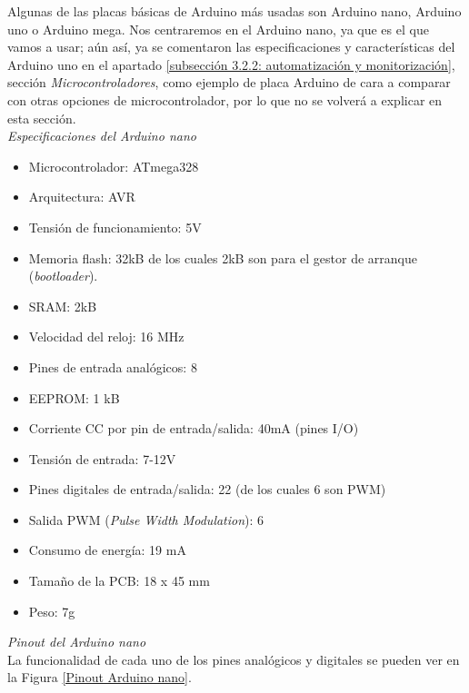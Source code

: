 \documentclass[12pt]{article}
\begin{document}
	\noindent Algunas de las placas básicas de Arduino más usadas son Arduino nano, Arduino uno o Arduino mega. Nos centraremos en el Arduino nano, ya que es el que vamos a usar; aún así, ya se comentaron las especificaciones y características del Arduino uno en el apartado \ref{subsección 3.2.2: automatización y monitorización}, sección \textit{Microcontroladores}, como ejemplo de placa Arduino de cara a comparar con otras opciones de microcontrolador, por lo que no se volverá a explicar en esta sección.  \\
	
	\noindent \textit{Especificaciones del Arduino nano} \\
	
	\begin{itemize}
		\item Microcontrolador: ATmega328
		\item Arquitectura: AVR
		\item Tensión de funcionamiento: 5V
		\item Memoria flash: 32kB de los cuales 2kB son para el gestor de arranque (\textit{bootloader}).
		\item SRAM: 2kB
		\item Velocidad del reloj: 16 MHz
		\item Pines de entrada analógicos: 8
		\item EEPROM: 1 kB
		\item Corriente CC por pin de entrada/salida: 40mA (pines I/O)
		\item Tensión de entrada: 7-12V
		\item Pines digitales de entrada/salida: 22 (de los cuales 6 son PWM)
		\item Salida PWM (\textit{Pulse Width Modulation}): 6
		\item Consumo de energía: 19 mA
		\item Tamaño de la PCB: 18 x 45 mm
		\item Peso: 7g
	\end{itemize}
	
	\noindent \textit{Pinout del Arduino nano} \\
	
	\noindent La funcionalidad de cada uno de los pines analógicos y digitales se pueden ver en la Figura \ref{Pinout Arduino nano}. \\
	
\end{document}
